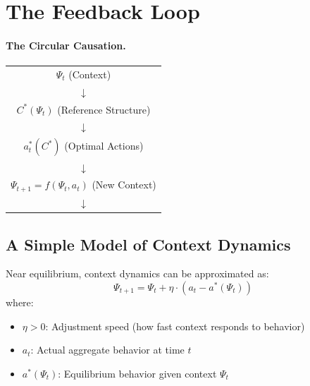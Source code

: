 
\section{The Feedback Loop}
\label{sec:context-feedback}


\paragraph{The Circular Causation.}

\begin{definition}
\begin{center}
\begin{tabular}{c}
$\Psi_t$ (Context) \\
$\downarrow$ \\
$C^*(\Psi_t)$ (Reference Structure) \\
$\downarrow$ \\
$a_t^*(C^*)$ (Optimal Actions) \\
$\downarrow$ \\
$\Psi_{t+1} = f(\Psi_t, a_t)$ (New Context) \\
$\downarrow$ \\
[cycle repeats]
\end{tabular}
\end{center}
\end{definition}

\subsection{A Simple Model of Context Dynamics}

\begin{definition}
Near equilibrium, context dynamics can be approximated as:
\begin{equation}
\Psi_{t+1} = \Psi_t + \eta \cdot (a_t - a^*(\Psi_t))
\label{eq:context-update}
\end{equation}
where:
\begin{itemize}[nosep]
  \item $\eta > 0$: Adjustment speed (how fast context responds to behavior)
  \item $a_t$: Actual aggregate behavior at time $t$
  \item $a^*(\Psi_t)$: Equilibrium behavior given context $\Psi_t$
\end{itemize}
\end{definition}

